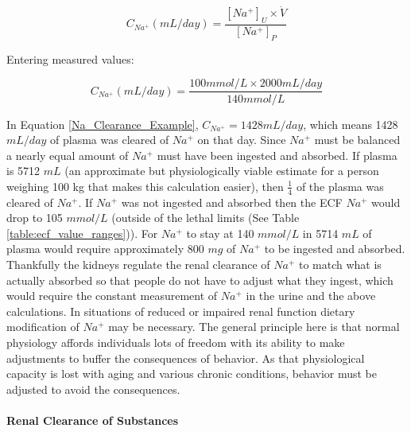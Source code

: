 \begin{equation}
    C_{Na^+} (mL/day) = \frac{[Na^+]_{U} \times \dot{V}}{[Na^+]_{P}}
    \label{Na_Clearance}
\end{equation}

\vspace{4mm}

Entering measured values:

\vspace{4mm}

\begin{equation}
    C_{Na^+} (mL/day) = \frac{100 mmol/L \times 2000 mL/day}{140 mmol/L}
    \label{Na_Clearance_Example}
\end{equation}

\vspace{4mm}

In Equation \ref{Na_Clearance_Example}, $C_{Na^+} = 1428 mL/day$, which means 1428 $mL/day$ of plasma was cleared of $Na^+$ on that day. Since $Na^+$ must be balanced a nearly equal amount of $Na^+$ must have been ingested and absorbed. If plasma is 5712 $mL$ (an approximate but physiologically viable estimate for a person weighing 100 kg that makes this calculation easier), then $\frac{1}{4}$ of the plasma was cleared of $Na^+$. If $Na^+$ was not ingested and absorbed then the ECF $Na^+$ would drop to 105 $mmol/L$ (outside of the lethal limits (See Table \ref{table:ecf_value_ranges})). For $Na^+$ to stay at 140 $mmol/L$ in 5714 $mL$ of plasma would require approximately 800 $mg$ of $Na^+$ to be ingested and absorbed.\footnotemark{}
Thankfully the kidneys regulate the renal clearance of $Na^+$ to match what is actually absorbed so that people do not have to adjust what they ingest, which would require the constant measurement of $Na^+$ in the urine and the above calculations.\footnotemark{} In situations of reduced or impaired renal function dietary modification of $Na^+$ may be necessary. The general principle here is that normal physiology affords individuals lots of freedom with its ability to make adjustments to buffer the consequences of behavior. As that physiological capacity is lost with aging and various chronic conditions, behavior must be adjusted to avoid the consequences. 

\paragraph{Renal Clearance of Substances}

